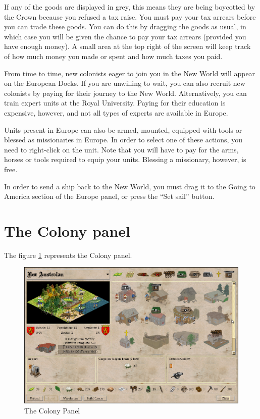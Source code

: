 \documentclass[12pt]{book}
\begin{document}
If any of the goods are displayed in grey, this means they are being
boycotted by the Crown because you refused a tax raise. You must pay
your tax arrears before you can trade these goods. You can do this by
dragging the goods as usual, in which case you will be given the
chance to pay your tax arrears (provided you have enough money). A
small area at the top right of the screen will keep track of how much
money you made or spent and how much taxes you paid.

From time to time, new colonists eager to join you in the New World
will appear on the European Docks. If you are unwilling to wait, you
can also recruit new colonists by paying for their journey to the New
World. Alternatively, you can train expert units at the Royal
University. Paying for their education is expensive, however, and not
all types of experts are available in Europe.

Units present in Europe can also be armed, mounted, equipped with
tools or blessed as missionaries in Europe. In order to select one of
these actions, you need to right-click on the unit. Note that you will
have to pay for the arms, horses or tools required to equip your
units. Blessing a missionary, however, is free.

In order to send a ship back to the New World, you must drag it to the
Going to America section of the Europe panel, or press the ``Set
sail'' button.


\hypertarget{colony panel}{\section{The Colony panel}}

The figure \ref{colony_panel_fig} represents the Colony panel.
\begin{figure}[htb]
  \begin{center}
    \includegraphics[scale=0.35]{images/colony_panel.png}
    \caption{The Colony Panel\label{colony_panel_fig}}
  \end{center}
\end{figure}
\end{document}

